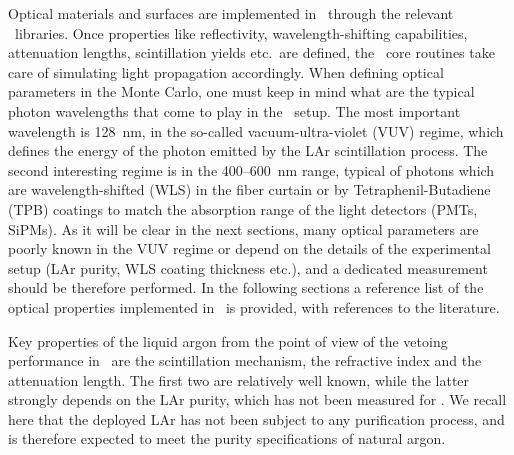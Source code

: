 Optical materials and surfaces are implemented in \mage\ through the relevant \geant\
libraries. Once properties like reflectivity, wavelength-shifting capabilities,
attenuation lengths, scintillation yields etc.~are defined, the \geant\ core routines take
care of simulating light propagation accordingly. When defining optical parameters in the
Monte Carlo, one must keep in mind what are the typical photon wavelengths that come to
play in the \gerda\ setup. The most important wavelength is 128~nm, in the so-called
vacuum-ultra-violet (VUV) regime, which defines the energy of the photon emitted by the
LAr scintillation process. The second interesting regime is in the 400--600~nm range,
typical of photons which are wavelength-shifted (WLS) in the fiber curtain or by
Tetraphenil-Butadiene (TPB) coatings to match the absorption range of the light detectors
(PMTs, SiPMs). As it will be clear in the next sections, many optical parameters are
poorly known in the VUV regime or depend on the details of the experimental setup (LAr
purity, WLS coating thickness etc.), and a dedicated measurement should be therefore
performed.  In the following sections a reference list of the optical properties
implemented in \mage\ is provided, with references to the literature.

Key properties of the liquid argon from the point of view of the vetoing performance in
\gerda\ are the scintillation mechanism, the refractive index and the attenuation length.
The first two are relatively well known, while the latter strongly depends on the LAr
purity, which has not been measured for \gerda. We recall here that the deployed LAr has
not been subject to any purification process, and is therefore expected to meet the purity
specifications of natural argon.

